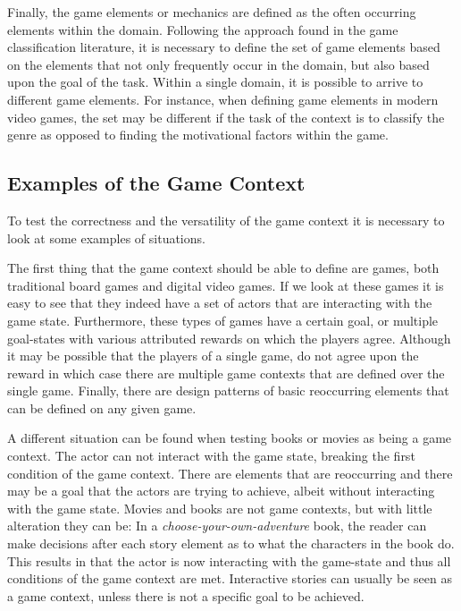 \documentclass[11pt]{article}
\begin{document}
Finally, the game elements or mechanics are defined as the often occurring elements within the domain. Following the approach found in the game classification literature, it is necessary to define the set of game elements based on the elements that not only frequently occur in the domain, but also based upon the goal of the task. Within a single domain, it is possible to arrive to different game elements. For instance, when defining game elements in modern video games, the set may be different if the task of the context is to classify the genre as opposed to finding the motivational factors within the game.

\subsection{Examples of the Game Context}
To test the correctness and the versatility of the game context it is necessary to look at some examples of situations.

The first thing that the game context should be able to define are games, both traditional board games and digital video games. If we look at these games it is easy to see that they indeed have a set of actors that are interacting with the game state. Furthermore, these types of games have a certain goal, or multiple goal-states with various attributed rewards on which the players agree. Although it may be possible that the players of a single game, do not agree upon the reward in which case there are multiple game contexts that are defined over the single game. Finally, there are design patterns of basic reoccurring elements that can be defined on any given game. 

A different situation can be found when testing books or movies as being a game context. The actor can not interact with the game state, breaking the first condition of the game context. There are elements that are reoccurring and there may be a goal that the actors are trying to achieve, albeit without interacting with the game state. Movies and books are not game contexts, but with little alteration they can be: In a \emph{choose-your-own-adventure} book, the reader can make decisions after each story element as to what the characters in the book do. This results in that the actor is now interacting with the game-state and thus all conditions of the game context are met. Interactive stories can usually be seen as a game context, unless there is not a specific goal to be achieved.
\end{document}
